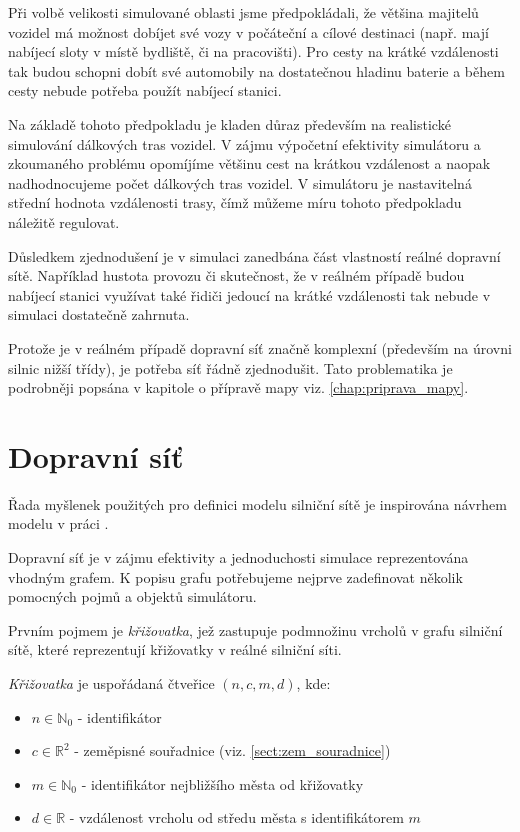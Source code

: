 Při volbě velikosti simulované oblasti jsme předpokládali, že většina majitelů
vozidel má možnost dobíjet své vozy v počáteční a cílové destinaci (např. mají
nabíjecí sloty v místě bydliště, či na pracovišti). Pro cesty na krátké vzdálenosti
tak budou schopni dobít své automobily na dostatečnou hladinu baterie a během cesty
nebude potřeba použít nabíjecí stanici. 

Na základě tohoto předpokladu je kladen důraz především na realistické simulování
dálkových tras vozidel. V zájmu výpočetní efektivity simulátoru a zkoumaného problému
opomíjíme většinu cest na krátkou vzdálenost a naopak nadhodnocujeme počet dálkových
tras vozidel. V simulátoru je nastavitelná střední hodnota vzdálenosti trasy, čímž
můžeme míru tohoto předpokladu náležitě regulovat.

Důsledkem zjednodušení je v simulaci zanedbána část vlastností reálné 
dopravní sítě. Například hustota provozu či skutečnost, že v reálném 
případě budou nabíjecí stanici využívat také řidiči jedoucí na krátké 
vzdálenosti tak nebude v simulaci dostatečně zahrnuta.

Protože je v reálném případě dopravní síť značně komplexní (především na 
úrovni silnic nižší třídy), je potřeba síť řádně zjednodušit. Tato problematika
je podrobněji popsána v kapitole o přípravě mapy viz. \cref{chap:priprava_mapy}.


\section{Dopravní síť}
\label{sec:dopravni_sit}

Řada myšlenek použitých pro definici modelu silniční sítě je inspirována 
návrhem modelu v práci \citet{kmeans_layout}.

Dopravní síť je v zájmu efektivity a jednoduchosti simulace reprezentována
vhodným grafem. K popisu grafu potřebujeme nejprve zadefinovat několik 
pomocných pojmů a objektů simulátoru.

Prvním pojmem je \emph{křižovatka}, jež zastupuje podmnožinu vrcholů v 
grafu silniční sítě, které reprezentují křižovatky v reálné silniční síti.

\begin{defn}[Křižovatka]\label{def:krizovatka}
    \emph{Křižovatka} je uspořádaná čtveřice $(n, c, m, d)$, kde:
    \begin{itemize}
        \item $n \in \mathbb{N}_0$ - identifikátor
        \item $c \in \mathbb{R}^2$ - zeměpisné souřadnice (viz. \cref{sect:zem_souradnice})
        \item $m \in \mathbb{N}_0$  - identifikátor nejbližšího města od křižovatky
        \item $d \in \mathbb{R}$ - vzdálenost vrcholu od středu města s 
        identifikátorem $m$
    \end{itemize}
\end{defn} 

